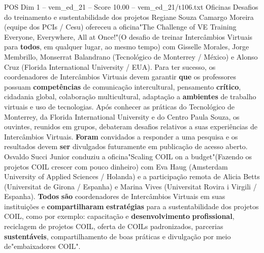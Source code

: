 \begin{textsample}{POS Dim 1 – vem\_ed\_21 – Score 10.00 – vem\_ed\_21/t106.txt}  \label{ex:f1_pos_165}
Oficinas Desafios do treinamento e sustentabilidade dos projetos Regiane Souza Camargo Moreira (equipe dos PCIs / Cesu) ofereceu a oficina"The Challenge of VE Training Everyone, Everywhere, All at Once!"(O desafio de treinar Intercâmbios Virtuais para \textbf{todos}, em qualquer lugar, ao mesmo tempo) com Gisselle Morales, Jorge Membrillo, Monserrat Balandrano (Tecnológico de Monterrey / México) e Alonso Cruz (Florida International University / EUA).
Para ter sucesso, os coordenadores de Intercâmbios Virtuais devem garantir \textbf{que} os professores possuam \textbf{competências} de comunicação intercultural, pensamento \textbf{crítico}, cidadania global, colaboração multicultural, adaptação a \textbf{ambientes} de trabalho virtuais e uso de tecnologias.
Após conhecer as práticas do Tecnológico de Monterrey, da Florida International University e do Centro Paula Souza, os ouvintes, reunidos em grupos, debateram desafios relativos a suas experiências de Intercâmbios Virtuais. \textbf{Foram} convidados a responder a uma pesquisa e os resultados devem \textbf{ser} divulgados futuramente em publicação de acesso aberto.
Osvaldo Succi Junior conduziu a oficina"Scaling COIL on a budget"(Fazendo os projetos COIL crescer com pouco dinheiro) com Eva Haug (Amsterdam University of Applied Sciences / Holanda) e a participação remota de Alicia Betts (Universitat de Girona / Espanha) e Marina Vives (Universitat Rovira i Virgili / Espanha). \textbf{Todos} \textbf{são} coordenadores de Intercâmbios Virtuais em suas instituições e \textbf{compartilharam} \textbf{estratégias} para a sustentabilidade dos projetos COIL, como por exemplo: capacitação e \textbf{desenvolvimento} \textbf{profissional}, reciclagem de projetos COIL, oferta de COILs padronizados, parcerias \textbf{sustentáveis}, compartilhamento de boas práticas e divulgação por meio de"embaixadores COIL".

\end{textsample}
